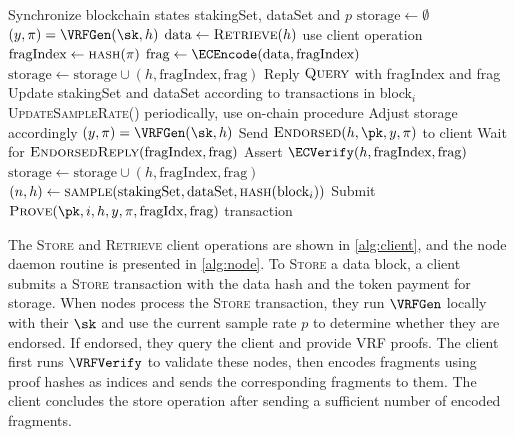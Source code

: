 \begin{algorithm}
\caption{Node routine}
\label{alg:node}
\begin{algorithmic}[1]
\State Synchronize blockchain states stakingSet, dataSet and $p$
\State $\text{storage} \gets \emptyset$
    \State $(y, \pi) = \VRFGen(\sk, h)$
        \State $\text{data} \gets \textsc{Retrieve}(h)$
        \Comment use client operation
        \State $\text{fragIndex} \gets \textsc{hash}(\pi)$
        \State $\text{frag} \gets \ECEncode(\text{data}, \text{fragIndex})$
        \State $\text{storage} \gets \text{storage} \cup (h, \text{fragIndex}, \text{frag})$
    \EndIf
\EndFor
{}
            \State Reply $\textsc{Query}$ with fragIndex and frag
        \EndIf
    \EndFor
    \State Update stakingSet and dataSet according to transactions in block$_i$
    \State \textsc{UpdateSampleRate}()
    \Comment periodically, use on-chain procedure
        \State Adjust storage accordingly
    \EndIf
        \State $(y, \pi) = \VRFGen(\sk, h)$
            \State Send $\textsc{Endorsed}(h, \pk, y, \pi)$ to client
            \State Wait for $\textsc{EndorsedReply}(\text{fragIndex}, \text{frag})$
            \State Assert $\ECVerify(h, \text{fragIndex}, \text{frag})$
            \State $\text{storage} \gets \text{storage} \cup (h, \text{fragIndex}, \text{frag})$
        \EndIf
    \EndFor
    \State $(n, h) \gets \textsc{sample}(\text{stakingSet}, \text{dataSet}, \textsc{hash}(\text{block}_i))$
        \State Submit $\textsc{Prove}(\pk, i, h, y, \pi, \text{fragIdx}, \text{frag})$ transaction
    \EndIf
\EndFor
\end{algorithmic}
\end{algorithm}

The \textsc{Store} and \textsc{Retrieve} client operations are shown in \cref{alg:client}, and the node daemon routine is presented in \cref{alg:node}.
To \textsc{Store} a data block, a client submits a \textsc{Store} transaction with the data hash and the token payment for storage.
When nodes process the \textsc{Store} transaction, they run $\VRFGen$ locally with their $\sk$ and use the current sample rate $p$ to determine whether they are endorsed.
If endorsed, they query the client and provide VRF proofs.
The client first runs $\VRFVerify$ to validate these nodes, then encodes fragments using proof hashes as indices and sends the corresponding fragments to them.
The client concludes the store operation after sending a sufficient number of encoded fragments.


